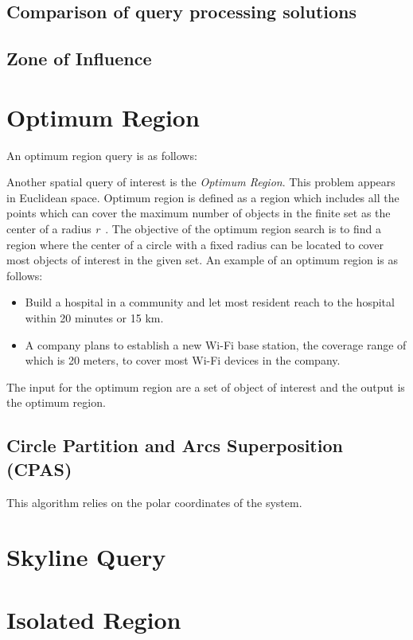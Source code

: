 \documentclass[a4paper,11pt]{article}
\begin{document}
\subsection{Comparison of query processing solutions}

\subsection{Zone of Influence}
 

\section{Optimum Region} 

An optimum region query is as follows: 

Another spatial query of interest is the \textit{Optimum Region}. This problem
appears in Euclidean space. Optimum region is defined as a region which
includes all the points which can cover the maximum number of objects in the
finite set as the center of a radius \textit{r}~\cite{Xuan2012}. The objective
of the optimum region search is to find a region where the center of a circle
with a fixed radius can be located to cover most objects of interest in the
given set. An example of an optimum region is as follows:


\begin{itemize}      
  \item Build a hospital in a community and let most
resident reach to the hospital within 20 minutes or 15 km.      
  \item A company plans to establish a new Wi-Fi base station, the coverage range of
which is 20 meters, to cover most Wi-Fi   devices in the company.
\end{itemize}

The input for the optimum region are a set of object of interest and the
output is the optimum region.

\subsection{Circle Partition and Arcs Superposition (CPAS)}
This algorithm relies on the polar coordinates of the system.

\section{Skyline Query}


\section{Isolated Region}
\end{document}
